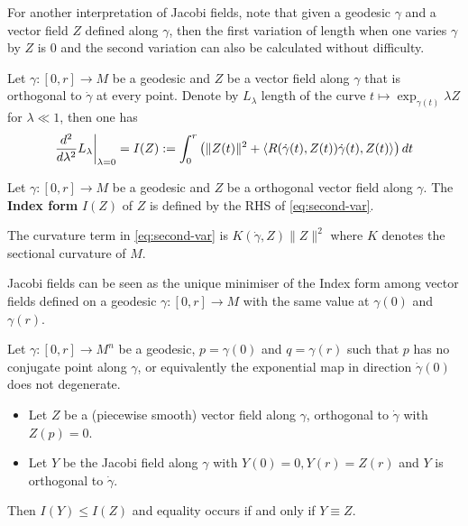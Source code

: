 For another interpretation of Jacobi fields, note that given a geodesic \(\gamma\) and a
vector field \(Z\) defined along \(\gamma\), then the first variation of length when
one varies \(\gamma\) by \(Z\) is 0 and the second variation can also be calculated
without difficulty.

\begin{proposition}
\label{prop:index-form-variation}
Let \(\gamma:[0,r] \longrightarrow M\) be a geodesic and \(Z\) be a vector field along \(\gamma\) that is
orthogonal to \(\dot\gamma\) at every point. Denote by \(L_\lambda\) length of the
curve \(t\mapsto \exp_{\gamma(t)}\lambda Z\) for \(\lambda \ll 1\), then one has
\begin{equation}
\label{eq:second-var}
 \restr{\frac{d^2}{d\lambda^2}L_\lambda}{\lambda = 0} = I(Z):=   \int_0^r \left( \|Z(t)\|^2 + \langle R(\dot\gamma(t), Z(t))\dot\gamma(t), Z(t) \rangle \right) dt
\end{equation}
\end{proposition}

\begin{definition}
Let \(\gamma:[0,r] \longrightarrow M\) be a geodesic and \(Z\) be a orthogonal vector
field along \(\gamma\). The \textbf{Index form} \(I(Z)\) of \(Z\) is defined by the RHS of \eqref{eq:second-var}.
\end{definition}

\begin{remark}
The curvature term in \eqref{eq:second-var} is \(K(\dot\gamma,Z)\|Z\|^2\) where \(K\) denotes the
sectional curvature of \(M\).
\end{remark}

Jacobi fields can be seen as the unique minimiser of the Index form among vector fields
defined on a geodesic \(\gamma:[0,r] \longrightarrow M\) with the same value at \(\gamma(0)\) and \(\gamma(r)\).

\begin{theorem}
\label{thm:index-ineq}
Let \(\gamma: [0,r] \longrightarrow M^n\) be a geodesic, \(p=\gamma(0)\) and \(q=\gamma(r)\) such that \(p\) has no conjugate point along \(\gamma\), or
equivalently the exponential map in direction \(\dot\gamma(0)\) does not degenerate.
\begin{itemize}
\item Let \(Z\) be a (piecewise smooth) vector field along \(\gamma\), orthogonal to \(\dot\gamma\) with \(Z(p)=0\).
\item Let \(Y\) be the Jacobi field along \(\gamma\) with \(Y(0) = 0, Y(r) = Z(r)\) and
\(Y\) is orthogonal to \(\dot\gamma\).
\end{itemize}
Then \(I(Y) \leq I(Z)\) and equality occurs if and only if \(Y\equiv Z\).
\end{theorem}

